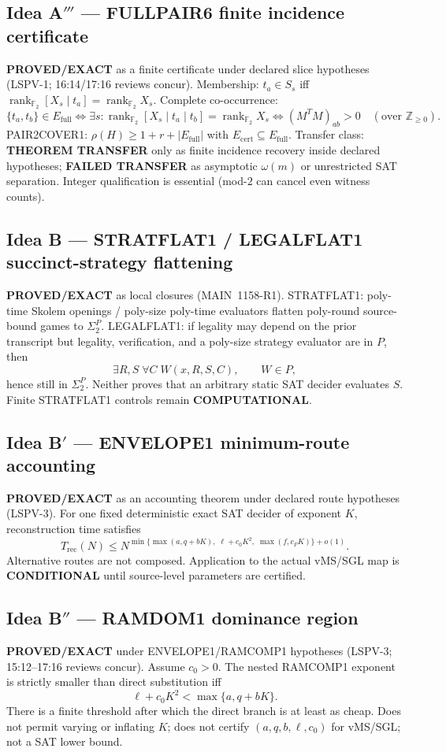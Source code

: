 \documentclass[11pt]{article}
\begin{document}
\subsection*{Idea A$'''$ --- FULLPAIR6 finite incidence certificate}
\textbf{PROVED/EXACT} as a finite certificate under declared slice hypotheses
(LSPV-1; 16:14/17:16 reviews concur). Membership:
$t_a\in S_s$ iff $\operatorname{rank}_{\mathbb F_2}[X_s\mid t_a]
=\operatorname{rank}_{\mathbb F_2}X_s$. Complete co-occurrence:
\[
\{t_a,t_b\}\in E_{\mathrm{full}}
\iff
\exists s:\operatorname{rank}_{\mathbb F_2}[X_s\mid t_a\mid t_b]
=\operatorname{rank}_{\mathbb F_2}X_s
\iff
(M^TM)_{ab}>0\quad(\text{over }\mathbb Z_{\ge 0}).
\]
PAIR2COVER1: $\rho(H)\ge 1+r+|E_{\mathrm{full}}|$ with
$E_{\mathrm{cert}}\subseteq E_{\mathrm{full}}$. Transfer class:
\textbf{THEOREM TRANSFER} only as finite incidence recovery inside declared
hypotheses; \textbf{FAILED TRANSFER} as asymptotic $\omega(m)$ or unrestricted SAT
separation. Integer qualification is essential (mod-$2$ can cancel even witness
counts).

\subsection*{Idea B --- STRATFLAT1 / LEGALFLAT1 succinct-strategy flattening}
\textbf{PROVED/EXACT} as local closures (MAIN~1158-R1).
STRATFLAT1: poly-time Skolem openings / poly-size poly-time evaluators flatten
poly-round source-bound games to $\Sigma_2^P$.
LEGALFLAT1: if legality may depend on the prior transcript but legality,
verification, and a poly-size strategy evaluator are in $P$, then
\[
\exists R,S\;\forall C\;W(x,R,S,C),\qquad W\in P,
\]
hence still in $\Sigma_2^P$. Neither proves that an arbitrary static SAT decider
evaluates $S$. Finite STRATFLAT1 controls remain \textbf{COMPUTATIONAL}.

\subsection*{Idea B$'$ --- ENVELOPE1 minimum-route accounting}
\textbf{PROVED/EXACT} as an accounting theorem under declared route hypotheses
(LSPV-3). For one fixed deterministic exact SAT decider of exponent $K$,
reconstruction time satisfies
\[
T_{\mathrm{rec}}(N)\le N^{\min\{\max(a,q+bK),\;\ell+c_0K^2,\;\max(f,c_FK)\}+o(1)}.
\]
Alternative routes are not composed. Application to the actual vMS/SGL map is
\textbf{CONDITIONAL} until source-level parameters are certified.

\subsection*{Idea B$''$ --- RAMDOM1 dominance region}
\textbf{PROVED/EXACT} under ENVELOPE1/RAMCOMP1 hypotheses (LSPV-3; 15:12--17:16
reviews concur). Assume $c_0>0$. The nested RAMCOMP1 exponent is strictly smaller
than direct substitution iff
\[
\ell+c_0K^2<\max\{a,q+bK\}.
\]
There is a finite threshold after which the direct branch is at least as cheap.
Does not permit varying or inflating $K$; does not certify $(a,q,b,\ell,c_0)$ for
vMS/SGL; not a SAT lower bound.
\end{document}
